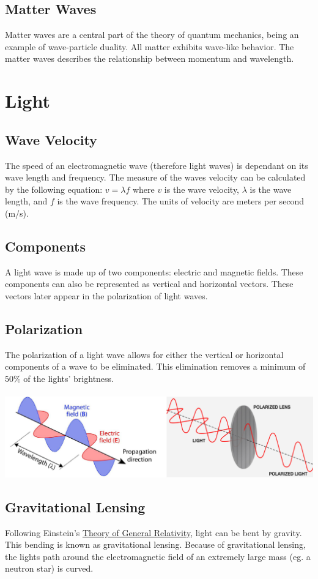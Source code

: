 \documentclass{article}
\begin{document}
\subsection{Matter Waves}
Matter waves are a central part of the theory of quantum mechanics, being an example of wave-particle duality. All matter exhibits wave-like behavior. The matter waves describes the relationship between momentum and wavelength.


\section{Light}
\subsection{Wave Velocity}
The speed of an electromagnetic wave (therefore light waves) is dependant on its wave length and frequency. The measure of the waves velocity can be calculated by the following equation: $v = \lambda f$ where $v$ is the wave velocity, $\lambda$ is the wave length, and $f$ is the wave frequency. The units of velocity are meters per second (m/s).

\subsection{Components}
A light wave is made up of two components: electric and magnetic fields. These components can also be represented as vertical and horizontal vectors. These vectors later appear in the polarization of light waves.

\subsection{Polarization}
The polarization of a light wave allows for either the vertical or horizontal components of a wave to be eliminated. This elimination removes a minimum of $50\%$ of the lights' brightness.\\\\
\includegraphics[scale=0.45]{images/polarization.png}
\subsection{Gravitational Lensing}\label{sec:gravitational_lensing}
Following Einstein's \hyperref[sec:generalrelativity]{Theory of General Relativity}, light can be bent by gravity. This bending is known as gravitational lensing. Because of gravitational lensing, the lights path around the electromagnetic field of an extremely large mass (eg. a neutron star) is curved.
\end{document}
